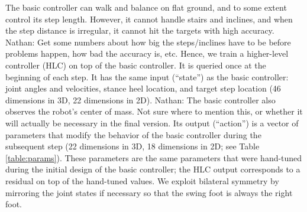 \documentclass[a4paper]{article}
\newcommand{\nhatch}[1]{{\leavevmode\color{blue} Nathan: #1}}
\begin{document}
The basic controller can walk and balance on flat ground, and to some extent control its step length.
However, it cannot handle stairs and inclines, and when the step distance is irregular, it cannot hit the targets with high accuracy.
\nhatch{Get some numbers about how big the steps/inclines have to be before problems happen, how bad the accuracy is, etc.}
Hence, we train a higher-level controller (HLC) on top of the basic controller.
It is queried once at the beginning of each step.
It has the same input (``state'') as the basic controller: joint angles and velocities, stance heel location, and target step location (46 dimensions in 3D, 22 dimensions in 2D).
\nhatch{The basic controller also observes the robot's center of mass. Not sure where to mention this, or whether it will actually be necessary in the final version.}
Its output (``action'') is a vector of parameters that modify the behavior of the basic controller during the subsequent step (22 dimensions in 3D, 18 dimensions in 2D; see Table \ref{table:params}).
These parameters are the same parameters that were hand-tuned during the initial design of the basic controller; the HLC output corresponds to a residual on top of the hand-tuned values.
We exploit bilateral symmetry by mirroring the joint states if necessary so that the swing foot is always the right foot.
\end{document}
